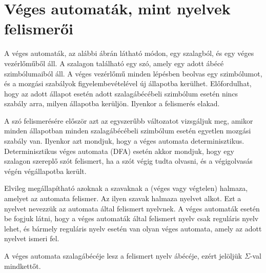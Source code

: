 \documentclass[a4paper]{article}
\begin{document}
\section{Véges automaták, mint nyelvek felismerői}

A véges automaták, az alábbi ábrán látható módon, egy szalagból,
és egy véges vezérlőműből áll. A szalagon található egy szó, amely egy
adott ábécé szimbólumaiból áll. A véges vezérlőmű minden lépésben
beolvas egy szimbólumot, és a mozgási szabályok figyelembevételével új
állapotba kerülhet. Előfordulhat, hogy az adott állapot esetén adott
szalagábécébeli szimbólum esetén nincs szabály arra, milyen állapotba
kerüljön. Ilyenkor a felismerés elakad.

A szó felismerésére először azt az egyszerűbb változatot vizsgáljuk meg,
amikor minden állapotban minden szalagábécébeli szimbólum esetén
egyetlen mozgási szabály van. Ilyenkor azt mondjuk, hogy a véges
automata determinisztikus.
Determinisztikus véges automata (DFA) esetén akkor mondjuk, hogy egy
szalagon szereplő szót felismert, ha a szót végig tudta olvasni, és a
végigolvasás végén végállapotba került.

Elvileg megállapítható azoknak a szavaknak a (véges vagy végtelen)
halmaza, amelyet az automata felismer. Az ilyen szavak halmaza nyelvet
alkot. Ezt a nyelvet nevezzük az automata által felismert nyelvnek. A
véges automaták esetén be fogjuk látni, hogy a véges automaták által
felismert nyelv csak reguláris nyelv lehet, és bármely reguláris nyelv
esetén van olyan véges automata, amely az adott nyelvet ismeri fel.

A véges automata szalagábécéje lesz a felismert nyelv ábécéje, ezért
jelöljük $\Sigma$-val mindkettőt.

\end{document}
